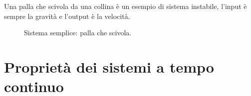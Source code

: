	\begin{nexample}
			Una palla che scivola da una collina è un esempio di sistema instabile, l'input è sempre la gravità e l'output è la velocità.
	
		\begin{figure}[H]
			\centering
			 \quad
			\caption{ Sistema semplice: palla che scivola. }
			\label{fig: pallaScivola}
		\end{figure}
	

	\end{nexample}


\section{Proprietà dei sistemi a tempo continuo}
	
